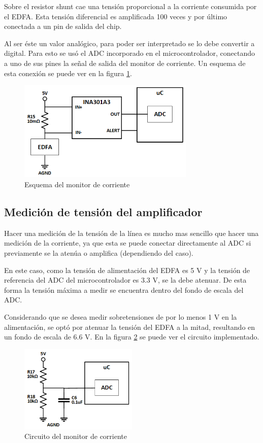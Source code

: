 Sobre el resistor shunt cae una tensión proporcional a la corriente consumida por el EDFA. Esta tensión diferencial es amplificada 100 veces y por último conectada a un pin de salida del chip.

Al ser éste un valor analógico, para poder ser interpretado se lo debe convertir a digital. Para esto se usó el ADC incorporado en el microcontrolador, conectando a uno de sus pines la señal de salida del monitor de corriente. Un esquema de esta conexión se puede ver en la figura \ref{fig:funcMonitor}.

\begin{figure}[H]
\centering
\includegraphics[width=0.75\textwidth]{./Figures/func_monitor.png}
\caption{Esquema del monitor de corriente}
\label{fig:funcMonitor}
\end{figure}



\subsection{Medición de tensión del amplificador}

Hacer una medición de la tensión de la línea es mucho mas sencillo que hacer una medición de la corriente, ya que esta se puede conectar directamente al ADC si previamente se la atenúa o amplifica (dependiendo del caso).

En este caso, como la tensión de alimentación del EDFA es 5 V y la tensión de referencia del ADC del microcontrolador es 3.3 V, se la debe atenuar. De esta forma la tensión máxima a medir se encuentra dentro del fondo de escala del ADC.

Considerando que se desea medir sobretensiones de por lo menos 1 V en la alimentación, se optó por atenuar la tensión del EDFA a la mitad, resultando en un fondo de escala de 6.6 V. En la figura \ref{fig:monTension} se puede ver el circuito implementado.

\begin{figure}[H]
\centering
\includegraphics[width=0.5\textwidth]{./Figures/mon_tension.png}
\caption{Circuito del monitor de corriente}
\label{fig:monTension}
\end{figure}


